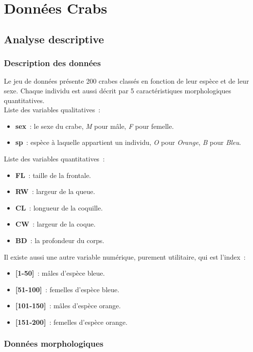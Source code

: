 \documentclass[a4paper,10pt]{report}
\begin{document}
\section{Données Crabs}

\subsection{Analyse descriptive}

\subsubsection{Description des données}
\label{subsection:describe_crabs}

Le jeu de données présente 200 crabes classés en fonction de leur espèce et de leur sexe. Chaque individu est aussi décrit par 5 caractéristiques morphologiques quantitatives.
\\
Liste des variables qualitatives~:
\begin{itemize}
	\item \textbf{sex}~: le sexe du crabe, \textit{M} pour mâle, \textit{F} pour femelle.
	\item \textbf{sp}~: espèce à laquelle appartient un individu, \textit{O} pour \textit{Orange}, \textit{B} pour \textit{Bleu}.
\end{itemize}
Liste des variables quantitatives~:
\begin{itemize}
	\item \textbf{FL}~: taille de la frontale.
	\item \textbf{RW}~: largeur de la queue.
	\item \textbf{CL}~: longueur de la coquille.
	\item \textbf{CW}~: largeur de la coque.
	\item \textbf{BD}~: la profondeur du corps.
\end{itemize}
Il existe aussi une autre variable numérique, purement utilitaire, qui est l'index~:
\begin{itemize}
	\item \textbf{[1-50]}~: mâles d'espèce bleue.
	\item \textbf{[51-100]}~: femelles d'espèce bleue.
	\item \textbf{[101-150]}~: mâles d'espèce orange.
	\item \textbf{[151-200]}~: femelles d'espèce orange.
\end{itemize}


\subsubsection{Données morphologiques}
\end{document}
